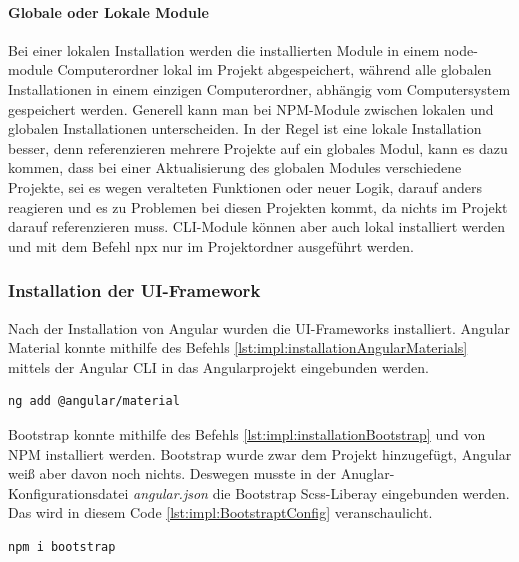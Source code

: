 \paragraph{Globale oder Lokale Module}
Bei einer lokalen Installation werden die installierten Module in einem node-module Computerordner lokal im Projekt abgespeichert, während alle globalen Installationen in einem einzigen Computerordner, abhängig vom Computersystem gespeichert werden.
Generell kann man bei NPM-Module zwischen lokalen und globalen Installationen unterscheiden. In der Regel ist eine lokale Installation besser, denn referenzieren mehrere Projekte auf ein globales Modul, kann es dazu kommen, dass bei einer Aktualisierung des globalen Modules verschiedene Projekte, sei es wegen veralteten Funktionen oder neuer Logik, darauf anders reagieren und es zu Problemen bei diesen Projekten kommt, da nichts im Projekt darauf referenzieren muss. 
CLI-Module können aber auch lokal installiert werden und mit dem Befehl npx nur im Projektordner ausgeführt  werden. 
\cite{npmlocalorglobal}

\subsubsection{Installation der UI-Framework}

Nach der Installation von Angular wurden die UI-Frameworks installiert. Angular Material konnte mithilfe des Befehls  \ref{lst:impl:installationAngularMaterials} mittels der Angular CLI in das Angularprojekt eingebunden werden.

\begin{lstlisting}[caption={{Terminal - Angular Material Installation}},language=bash,label=lst:impl:installationAngularMaterials]
    ng add @angular/material
\end{lstlisting}

Bootstrap konnte mithilfe des Befehls \ref{lst:impl:installationBootstrap} und von NPM installiert werden. Bootstrap wurde zwar dem Projekt hinzugefügt, Angular weiß aber davon noch nichts. Deswegen musste in der Anuglar-Konfigurationsdatei \emph{angular.json} die Bootstrap Scss-Liberay eingebunden werden. Das wird in diesem Code \ref{lst:impl:BootstraptConfig} veranschaulicht. 

\begin{lstlisting}[caption={{Terminal - Bootstrap Installation}},language=bash,label=lst:impl:installationBootstrap]
    npm i bootstrap
\end{lstlisting}

